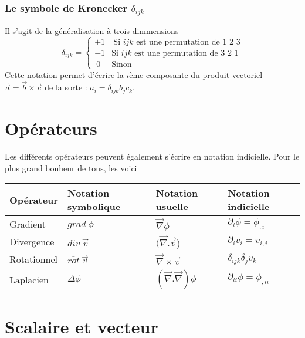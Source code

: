         \subsubsection{Le symbole de Kronecker $\delta_{ijk}$}
        Il s'agit de la généralisation à trois dimmensions
        \begin{equation}
        \delta_{ijk} = \left\{\begin{array}{ll}
         +1&\ \text{Si $ijk$ est une permutation de 1 2 3}  \\
         -1&  \text{Si $ijk$ est une permutation de 3 2 1}\\
         \ 0& \text{Sinon}
        \end{array}\right.
        \end{equation}
        Cette notation permet d'écrire la $i$ème composante du produit vectoriel $\vec{a}=\vec{b}\times
        \vec{c}$ de la sorte : $a_i = \delta_{ijk}b_jc_k$.
        
        
        
        
        
        
\section{Opérateurs}
    Les différents opérateurs peuvent également s'écrire en notation indicielle. Pour le plus grand 
    bonheur de tous, les voici
    
    \begin{center}
    \begin{tabularx}{10cm}{|X|X|X|X|}
        \hline 
        Opérateur & Notation symbolique& Notation usuelle & Notation indicielle \tabularnewline 
        \hline 
        Gradient & $\overline{grad}\ \phi$ & $\vec{\nabla}\phi$ & $\partial_i \phi = \phi_{,i}$\tabularnewline 
        \hline 
        Divergence & $div\ \vec{v}$ & $(\vec{\nabla}.\vec{v}$) & $\partial_i v_i = v_{i,i}$\tabularnewline
        \hline
        Rotationnel & $\overline{rot}\ \vec{v}$ & $\vec{\nabla}\times \vec{v}$ & $\delta_{ijk}\delta_j v_k$\tabularnewline
        \hline
        Laplacien & $\Delta \phi$ & $(\vec{\nabla}.\vec{\nabla})\phi$ & $\partial_{ii} \phi 
        = \phi_{,ii}$\tabularnewline
        \hline
        \end{tabularx}
    \label{tab:comparaison}
    \end{center}
    
\section{Scalaire et vecteur}

